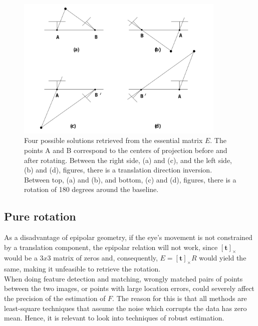 \begin{figure}[ht]
	\centering
	\includegraphics[width=10cm]{images/ep4sols.png}
	\caption[Four possible solutions retrieved from $E$]{Four possible solutions retrieved from the essential matrix $E$. The points A and B correspond to the centers of projection before and after rotating. Between the right side, (a) and (c), and the left side, (b) and (d), figures, there is a translation direction inversion. Between top, (a) and (b), and bottom, (c) and (d), figures, there is a rotation of 180 degrees around the baseline. \cite{multiview}}
	\label{sec2:fig:ep4}
\end{figure}

\subsection{Pure rotation}

As a disadvantage of epipolar geometry, if the eye's movement is not constrained by a translation component, the epipolar relation will not work, since $[\mathbf{t}]_\times$ would be a $3x3$ matrix of zeros and, consequently, $E = [\mathbf{t}]_\times R$ would yield the same, making it unfeasible to retrieve the rotation.\\

When doing feature detection and matching, wrongly matched pairs of points between the two images, or points with large location errors, could severely affect the precision of the estimation of $F$. The reason for this is that all methods are least-square techniques that assume the noise which corrupts the data has zero mean. Hence, it is relevant to look into techniques of robust estimation.

